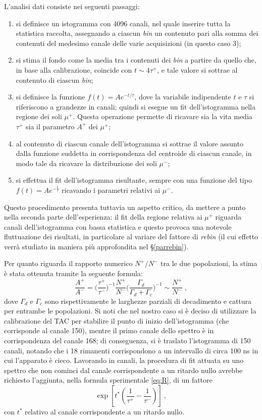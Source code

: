 \documentclass[10pt, oneside, a4paper]{article}   	%
\begin{document}
L'analisi dati consiste nei seguenti passaggi:
\begin{enumerate}
	\item si definisce un istogramma con 4096 canali, nel quale inserire tutta la statistica raccolta, assegnando a ciascun \emph{bin} un contenuto pari alla somma dei contenuti del medesimo canale delle varie acquisizioni (in questo caso 3);
	\item si stima il fondo come la media tra i contenuti dei \emph{bin} a partire da quello che, in base alla calibrazione, coincide con $t\sim 4\tau^+$, e tale valore si sottrae al contenuto di ciascun \emph{bin};
	\item si definisce la funzione $f(t)=Ae^{-t/\tau}$, dove la variabile indipendente $t$ e $\tau$ si riferiscono a grandezze in canali; quindi si esegue un fit dell'istogramma nella regione dei soli $\mu^+$. Questa operazione permette di ricavare sia la vita media $\tau^+$ sia il parametro $A^+$ dei $\mu^+$; 
	\item al contenuto di ciascun canale dell'istogramma si sottrae il valore assunto dalla funzione suddetta in corrispondenza del centroide di ciascun canale, in modo tale da ricavare la distribuzione dei soli $\mu^-$;
	\item si effettua il fit dell'istogramma risultante, sempre con una funzione del tipo $f(t)=Ae^{-\frac{t}{\tau}}$ ricavando i parametri relativi ai $\mu^-$.
\end{enumerate}
Questo procedimento presenta tuttavia un aspetto critico, da mettere a punto nella seconda parte dell'esperienza: il fit della regione relativa ai $\mu^+$ riguarda canali dell'istogramma con bassa statistica e questo provoca una notevole fluttuazione dei risultati, in particolare al variare del fattore di \emph{rebin} (il cui effetto verrà studiato in maniera più approfondita nel \S\ref{parrebin}).

Per quanto riguarda il rapporto numerico $N^+/N^-$ tra le due popolazioni, la stima è stata ottenuta tramite la seguente formula: 
\begin{equation}
\frac{A^+}{A^-}= \bigg ( \frac{\tau^+}{\tau^-} \bigg )  ^{-1} \frac{N^+}{N^-} \bigg ( \frac{\Gamma_d}{\Gamma_d+\Gamma_c} \bigg )^{-1}\sim\frac{N^+}{N^-}\;,
\label{eq:R}%
\end{equation}
dove $\Gamma_d$ e $\Gamma_c$ sono rispettivamente le larghezze parziali di decadimento e cattura per entrambe le popolazioni. 
Si noti che nel nostro caso si è deciso di utilizzare la calibrazione del TAC per stabilire il punto di inizio dell'istogramma (che corrisponde al canale 150), mentre il primo canale dello spettro è in corrispondenza del canale 168; di conseguenza, si è traslato l'istogramma di 150 canali, notando che i 18  rimanenti corrispondono a un intervallo di circa 100 ns in cui l'apparato è cieco.
Lavorando in canali, la procedura di fit attuata su uno spettro che non cominci dal canale corrispondente a un ritardo nullo avrebbe richiesto l'aggiunta, nella formula sperimentale \ref{eq:R}, di un fattore
\[\exp\left[t^*\left(\frac{1}{\tau^+}-\frac{1}{\tau^-}\right)\right]\ ,\]
con $t^*$ relativo  al canale corrispondente a un ritardo nullo.
\end{document}
